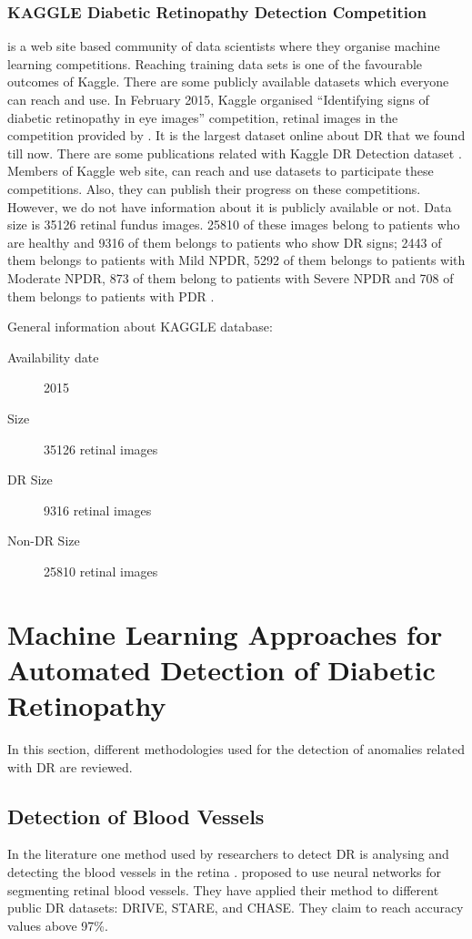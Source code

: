 \subsubsection{KAGGLE Diabetic Retinopathy Detection Competition}
\citet{KAGGLE} is a web site based community of data scientists where they organise machine learning competitions. Reaching training data sets is one of the favourable outcomes of Kaggle. There are some publicly available datasets which everyone can reach and use. In February 2015, Kaggle organised ``Identifying signs of diabetic retinopathy in eye images'' competition, retinal images in the competition provided by \citet{eyePACS}. It is the largest dataset online about DR that we found till now. There are some publications related with Kaggle DR Detection dataset \citep{albanautomated, van2016fast}. Members of Kaggle web site, can reach and use datasets to participate these competitions. Also, they can publish their progress on these competitions. However, we do not have information about it is publicly available or not. Data size is 35126 retinal fundus images\citep{van2016fast}. 25810 of these images belong to patients who are healthy and 9316 of them belongs to patients who show DR signs; 2443 of them belongs to patients with Mild NPDR, 5292 of them belongs to patients with Moderate NPDR, 873 of them belong to patients with Severe NPDR and 708 of them belongs to patients with PDR \citep{albanautomated}. 


General information about KAGGLE database:
\begin{description}
    \item[Availability date] 2015
    \item[Size] 35126 retinal images
    \item[DR Size] 9316 retinal images
    \item[Non-DR Size] 25810 retinal images
\end{description}

\section{Machine Learning Approaches for Automated Detection of Diabetic Retinopathy}
In this section, different methodologies used for the detection of anomalies related with DR are reviewed. 

\subsection{Detection of Blood Vessels}
In the literature one method used by researchers to detect DR is analysing and detecting the blood vessels in the retina \citep{liskowski2016segmenting, elbalaoui2016automatic}.
\citet{liskowski2016segmenting} proposed to use neural networks for segmenting retinal blood vessels. They have applied their method to different public DR datasets: DRIVE, STARE, and CHASE. They claim to reach accuracy values above 97\%.

